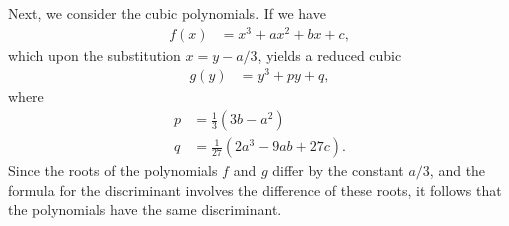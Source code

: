 \documentclass[10pt]{mypackage}
\begin{document}
Next, we consider the cubic polynomials. If we have
\begin{align*}
  f(x) &= x^3 + ax^2 + bx + c,
\end{align*}
which upon the substitution $x = y-a/3$, yields a reduced cubic
\begin{align*}
  g(y) &= y^3 + py + q,
\end{align*}
where
\begin{align*}
  p &= \frac{1}{3} \left( 3b-a^2 \right)\\
  q &= \frac{1}{27} \left( 2a^3 - 9ab + 27c \right).
\end{align*}
Since the roots of the polynomials $f$ and $g$ differ by the constant $a/3$, and the formula for the discriminant involves the difference of these roots, it follows that the polynomials have the same discriminant.
\end{document}

